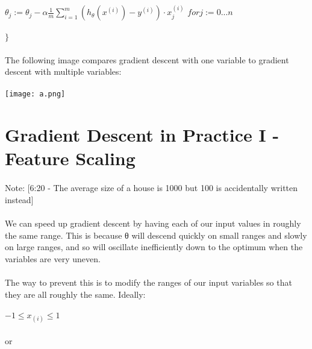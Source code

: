 \documentclass{article}
\begin{document}
\begin{CJK}{UTF8}{gbsn}
\begin{algorithm}
\paragraph{}
$\theta_{j}:=\theta_{j}-\alpha\frac{1}{m}\sum\limits_{i=1}^{m}(h_{\theta}(x^{(i)})-y^{(i)})\cdot x^{(i)}_{j}$            \qquad $for j:=0...n$
\paragraph{}
$\rbrace$
\end{algorithm}
\paragraph{}
The following image compares gradient descent with one variable to gradient descent with multiple variables:
\paragraph{}
\texttt{[image: a.png]}
\section{Gradient Descent in Practice I - Feature Scaling
}
\paragraph{}
Note: [6:20 - The average size of a house is 1000 but 100 is accidentally written instead]
\paragraph{}
We can speed up gradient descent by having each of our input values in roughly the same range. This is because θ will descend quickly on small ranges and slowly on large ranges, and so will oscillate inefficiently down to the optimum when the variables are very uneven.
\paragraph{}
The way to prevent this is to modify the ranges of our input variables so that they are all roughly the same. Ideally:
\paragraph{}
$-1\leq x_{(i)}\leq1$
\paragraph{}
or

\end{CJK}
\end{document}
